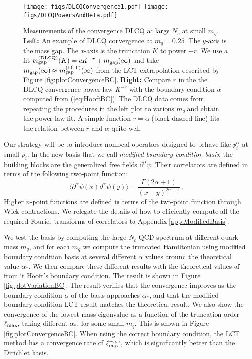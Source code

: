 \documentclass[12pt]{article}
\def\>{\rangle}
\def\<{\langle}
\renewcommand{\d}{\partial}
\newcommand{\Nc}{N_c}
\begin{document}
\begin{figure}[ht]
\centering 
\texttt{[image: figs/DLCQConvergence1.pdf]}
\texttt{[image: figs/DLCQPowersAndBeta.pdf]}
\caption{\label{fig:DLCQ}
Measurements of the convergence DLCQ at large $\Nc$ at small $m_q$. 
{\bf Left: } An example of DLCQ convergence at $m_q=0.25$. The $y$-axis is the mass gap. The $x$-axis is the truncation $K$ to power $-r$. We use a fit $m_{\rm gap}^{\rm (DLCQ)}(K) = c K^{-r} + m_{\rm gap}(\infty)$ and take $m_{\rm gap}(\infty) \approx m_{\rm gap}^{(\rm LCT)}(\infty)$ from the LCT extrapolation described by Figure
\ref{fig:plotConvergenceBC}.
{\bf Right: } Compare $r$ in the the DLCQ convergence power law $K^{-r}$ with the boundary condition $\alpha$ computed from (\ref{eq:HooftBC}). The DLCQ data comes from repeating the procedures in the left plot to various $m_q$ and obtain the power law fit. A simple function $r=\alpha$ (black dashed line) fits the relation between $r$ and $\alpha$ quite well.
}
\end{figure}

Our strategy will be to introduce nonlocal operators designed to behave like $p_i^{\alpha}$ at small $p_i$. In the new basis that we call {\it modified boundary condition basis}, the building blocks are the generalized free fields $\d^\alpha \psi$.  Their correlators are defined in terms of the following two-point function: 
\begin{equation}
\< \d^\alpha \psi (x) \d^\alpha \psi(y) \> = \frac{\Gamma(2\alpha+1)}{(x-y)^{2\alpha+1}} \, .
\end{equation}
Higher $n$-point functions are defined in terms of the two-point function through Wick contractions. We relegate the details of how to efficiently compute all the required Fourier transforms of correlators to Appendix \ref{app:ModifiedBasis}.

We test the basis by computing the large $\Nc$ QCD spectrum at different quark mass $m_q$, and for each $m_q$ we compute the truncated Hamiltonian using modified boundary condition basis at several different $\alpha$ values around the theoretical value $\alpha_*$. We then compare these different results with the theoretical values of from `t Hooft's boundary condition. The result is shown in Figure \ref{fig:plotVariationBC}. The result verifies that the convergence improves as the boundary condition $\alpha$ of the basis approaches $\alpha_*$, and that the modified boundary condition LCT result matches the theoretical result. We also show the convergence of the lowest mass eigenvalue as a function of the truncation order $\ell_{\rm max}$, taking different $\alpha_*$, for some small $m_q$. This is shown in Figure \ref{fig:plotConvergenceBC}. When using the correct boundary condition, the LCT method has a convergence rate of $\ell_{\rm max}^{-5.5}$, which is significantly better than the Dirichlet basis.
\end{document}
